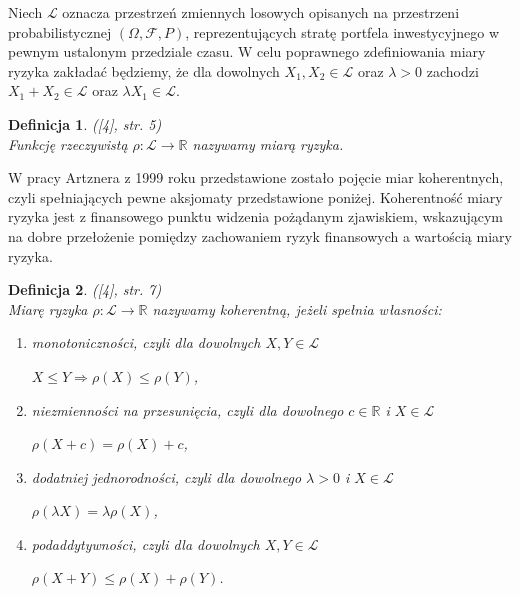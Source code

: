 \documentclass[12pt,a4paper,openany]{book}
\newtheorem{df}{Definicja}
\begin{document}
Niech $\mathcal{L}$ oznacza przestrzeń zmiennych losowych opisanych na przestrzeni probabilistycznej $(\Omega,\mathcal{F},P)$, reprezentujących stratę portfela inwestycyjnego w pewnym ustalonym przedziale czasu. W celu poprawnego zdefiniowania miary ryzyka zakładać będziemy, że dla dowolnych $X_{1},X_{2} \in \mathcal{L}$ oraz $\lambda > 0$ zachodzi $X_{1} + X_{2} \in \mathcal{L}$ oraz $\lambda X_{1} \in \mathcal{L}$.

\begin{df}\textnormal{([4], str. 5)}\*\\
Funkcję rzeczywistą $\rho:\mathcal{L} \rightarrow \mathbb{R}$ nazywamy miarą ryzyka.
\end{df}

W pracy Artznera z 1999 roku przedstawione zostało pojęcie miar koherentnych, czyli spełniających pewne aksjomaty przedstawione poniżej. Koherentność miary ryzyka jest z finansowego punktu widzenia pożądanym zjawiskiem, wskazującym na dobre przełożenie pomiędzy zachowaniem ryzyk finansowych a wartością miary ryzyka.

\begin{df}\textnormal{([4], str. 7)}\*\\
Miarę ryzyka $\rho:\mathcal{L} \rightarrow \mathbb{R}$ nazywamy koherentną, jeżeli spełnia własności:

\begin{enumerate}

\item 

monotoniczności, czyli dla dowolnych $X,Y \in \mathcal{L}$

\begin{center}
$X \leqslant Y \Rightarrow \rho(X) \leqslant \rho(Y)$,
\end{center}

\item 

niezmienności na przesunięcia, czyli dla dowolnego $c \in \mathbb{R}$ i $X \in \mathcal{L}$

\begin{center}
$\rho(X+c) = \rho(X) + c$,
\end{center}

\item 

dodatniej jednorodności, czyli dla dowolnego $\lambda > 0$ i $X \in \mathcal{L}$

\begin{center}
$\rho(\lambda X) = \lambda\rho(X)$,
\end{center}

\item 

podaddytywności, czyli dla dowolnych $X,Y \in \mathcal{L}$

\begin{center}
$\rho(X+Y) \leqslant \rho(X) + \rho(Y)$.
\end{center}

\end{enumerate}

\end{df}
\end{document}
